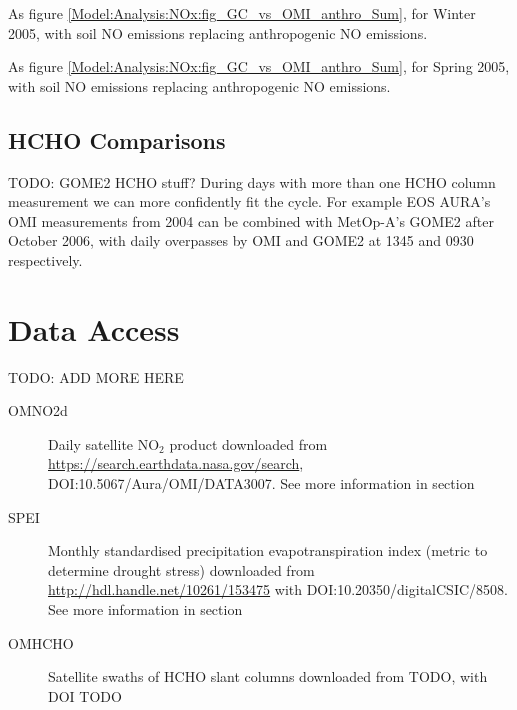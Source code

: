       {As figure \ref{Model:Analysis:NOx:fig_GC_vs_OMI_anthro_Sum}, for Winter 2005, with soil NO emissions replacing anthropogenic NO emissions.}
      {\label{Model:Analysis:NOx:fig_GC_vs_OMI_soil_Win}}
      
      {As figure \ref{Model:Analysis:NOx:fig_GC_vs_OMI_anthro_Sum}, for Spring 2005, with soil NO emissions replacing anthropogenic NO emissions.}
      {\label{Model:Analysis:NOx:fig_GC_vs_OMI_soil_Spr}}
    
    
  \subsection{HCHO Comparisons}
    TODO: GOME2 HCHO stuff?
    During days with more than one HCHO column measurement we can more confidently fit the cycle. 
    For example EOS AURA's OMI measurements from 2004 can be combined with MetOp-A's GOME2 after October 2006, with daily overpasses by OMI and GOME2 at 1345 and 0930 respectively.
   
\section{Data Access}
TODO: ADD MORE HERE
\label{Model:DataAccess}
\begin{description}
  \item[OMNO2d] Daily satellite NO$_2$ product downloaded from \url{https://search.earthdata.nasa.gov/search}, DOI:10.5067/Aura/OMI/DATA3007. 
  See more information in section %
  
  \item[SPEI] Monthly standardised precipitation evapotranspiration index (metric to determine drought stress) downloaded from \url{http://hdl.handle.net/10261/153475} with DOI:10.20350/digitalCSIC/8508.
  See more information in section %
  
  \item[OMHCHO] Satellite swaths of HCHO slant columns downloaded from TODO, with DOI TODO
  
\end{description}
